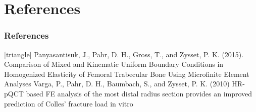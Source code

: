 \documentclass[xcolor=table]{beamer}
\begin{document}

\appendix

\section{References}
\begin{frame}
	\frametitle{References}
	\footnotesize{
		\begin{thebibliography}{99}
			[triangle]
			 Panyasantisuk, J., Pahr, D. H., Gross, T., and Zysset, P. K. (2015).
			\newblock Comparison of Mixed and Kinematic Uniform Boundary Conditions in Homogenized Elasticity of Femoral Trabecular Bone Using Microfinite Element Analyses
			\vspace{5mm}
			 Varga, P., Pahr, D. H., Baumbach, S., and Zysset, P. K. (2010)
			\newblock HR-pQCT based FE analysis of the most distal radius section provides an improved prediction
			of Colles’ fracture load in vitro
		\end{thebibliography}
	}
\end{frame}

\end{document}
